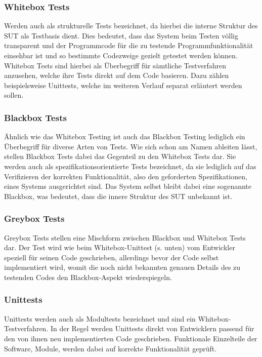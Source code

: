 \subsubsection*{Whitebox Tests}\label{subsubsec:whitebox}
Werden auch als strukturelle Tests bezeichnet, da hierbei die interne Struktur des \ac{SUT} als Testbasis dient. Dies bedeutet, dass das System beim Testen völlig transparent und der Programmcode für die zu testende Programmfunktionalität einsehbar ist und so bestimmte Codezweige gezielt getestet werden können. \cite[S. 125f.]{oregan:2019} Whitebox Tests sind hierbei als Überbegriff für sämtliche Testverfahren anzusehen, welche ihre Tests direkt auf dem Code basieren. Dazu zählen beispielsweise Unittests, welche im weiteren Verlauf separat erläutert werden sollen. 

\subsubsection*{Blackbox Tests}\label{subsubsec:blackbox}
Ähnlich wie das Whitebox Testing ist auch das Blackbox Testing lediglich ein Überbegriff für diverse Arten von Tests. Wie sich schon am Namen ableiten lässt, stellen Blackbox Tests dabei das Gegenteil zu den Whitebox Tests dar. Sie werden auch als spezifikationsorientierte Tests bezeichnet, da sie lediglich auf das Verifizieren der korrekten Funktionalität, also den geforderten Spezifikationen, eines Systems ausgerichtet sind. Das System selbst bleibt dabei eine sogenannte Blackbox, was bedeutet, dass die innere Struktur des \ac{SUT} unbekannt ist. \cite[S. 120f.]{oregan:2019}

\subsubsection*{Greybox Tests}\label{subsubsec:greybox}
Greybox Tests stellen eine Mischform zwischen Blackbox und Whitebox Tests dar. Der Test wird wie beim Whitebox-Unittest (s. unten) vom Entwickler speziell für seinen Code geschrieben, allerdings bevor der Code selbst implementiert wird, womit die noch nicht bekannten genauen Details des zu testenden Codes den Blackbox-Aspekt wiederspiegeln. \cite[S. 86]{witte:2019}

\subsubsection*{Unittests}\label{subsubsec:unittest}
Unittests werden auch als Modultests bezeichnet und sind ein Whitebox-Testverfahren. In der Regel werden Unittests direkt von Entwicklern passend für den von ihnen neu implementierten Code geschrieben. Funktionale Einzelteile der Software, Module, werden dabei auf korrekte Funktionalität geprüft. \cite[S. 75]{witte:2019}

